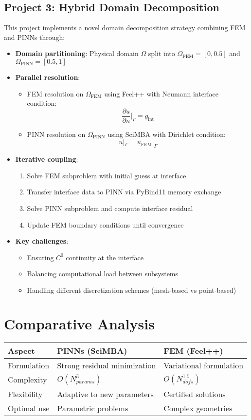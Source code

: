 \documentclass{article}
\begin{document}
\subsection{Project 3: Hybrid Domain Decomposition}
This project implements a novel domain decomposition strategy combining FEM and PINNs through:
\begin{itemize}
\item \textbf{Domain partitioning}: Physical domain \(\Omega\) split into \(\Omega_{\text{FEM}} = [0,0.5]\) and \(\Omega_{\text{PINN}} = [0.5,1]\)
\item \textbf{Parallel resolution}:
\begin{itemize}
\item FEM resolution on \(\Omega_{\text{FEM}}\) using Feel++ with Neumann interface condition:
\[
\frac{\partial u}{\partial n}\Big|_{\Gamma} = g_{\text{int}}
\]
\item PINN resolution on \(\Omega_{\text{PINN}}\) using SciMBA with Dirichlet condition:
\[
u|_{\Gamma} = u_{\text{FEM}}|_{\Gamma}
\]
\end{itemize}
\item \textbf{Iterative coupling}:
\begin{enumerate}
\item Solve FEM subproblem with initial guess at interface
\item Transfer interface data to PINN via PyBind11 memory exchange
\item Solve PINN subproblem and compute interface residual
\item Update FEM boundary conditions until convergence
\end{enumerate}
\item \textbf{Key challenges}:
\begin{itemize}
\item Ensuring \(C^0\) continuity at the interface
\item Balancing computational load between subsystems
\item Handling different discretization schemes (mesh-based vs point-based)
\end{itemize}
\end{itemize}


\section{Comparative Analysis}
\begin{tabularx}{\textwidth}{lXX}
\toprule
\textbf{Aspect} & \textbf{PINNs (SciMBA)} & \textbf{FEM (Feel++)} \\
\midrule
Formulation & Strong residual minimization & Variational formulation \\
Complexity & \( O(N_{params}^3) \) & \( O(N_{dofs}^{1.5}) \) \\
Flexibility & Adaptive to new parameters & Certified solutions \\
Optimal use & Parametric problems & Complex geometries \\
\bottomrule
\end{tabularx}
\end{document}
